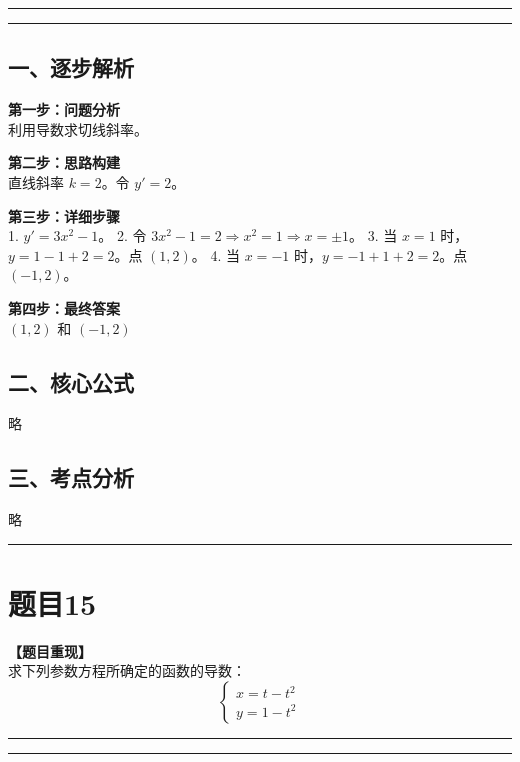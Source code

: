 \documentclass[12pt, a4paper]{ctexart}
\newcommand{\TopSeparator}{
    \par\noindent\rule{\textwidth}{1.5pt}\vspace{0.5em} %
}
\newcommand{\AnalysisSeparator}{
    \par\noindent\rule{\textwidth}{0.5pt}\vspace{0.2em}\hrule\vspace{0.5em} %
}
\newenvironment{RedAnalysis}{
    \par
    \color{red} %
}{
    \par
    \color{black} %
}
\begin{document}
\AnalysisSeparator

\begin{RedAnalysis}

\subsection*{一、逐步解析}

\textbf{第一步：问题分析} \\
利用导数求切线斜率。

\textbf{第二步：思路构建} \\
直线斜率 $k=2$。令 $y'=2$。

\textbf{第三步：详细步骤} \\
1. $y' = 3x^2 - 1$。
2. 令 $3x^2 - 1 = 2 \Rightarrow x^2 = 1 \Rightarrow x = \pm 1$。
3. 当 $x = 1$ 时，$y = 1 - 1 + 2 = 2$。点 $(1, 2)$。
4. 当 $x = -1$ 时，$y = -1 + 1 + 2 = 2$。点 $(-1, 2)$。

\textbf{第四步：最终答案} \\
$(1,2)$ 和 $(-1,2)$

\subsection*{二、核心公式}
略

\subsection*{三、考点分析}
略

\end{RedAnalysis}

\vspace{2em}

\TopSeparator
\section*{题目15}

\textbf{【题目重现】} \\
求下列参数方程所确定的函数的导数：
$$ \begin{cases}x=t-t^{2}\\ y=1-t^{2}\end{cases} $$

\AnalysisSeparator
\end{document}
